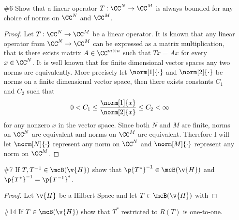 \documentclass[11pt, oneside]{article}
\begin{document}
\begin{enumerate}
\begin{proof}
      Lastly I will show that $\norm{S} = \norm{T}$.
      Consider the following.
      \begin{align*}
        \norm{S} &= \sup*[x \in \overline{D(T)}]{\frac{\norm[Y]{Sx}}{\norm[X]{x}}} \\
      \end{align*}
    \end{proof}

  \pagebreak
  \item[\#6]
    Show that a linear operator $T:\CC^N \to \CC^M$ is always bounded for
    any choice of norms on $\CC^N$ and $\CC^M$.

    \begin{proof}
      Let $T:\CC^N \to \CC^M$ be a linear operator.
      It is known that any linear operator from $\CC^N \to \CC^M$ can be
      expressed as a matrix multiplication, that is there exists matrix
      $A \in \CC^{m \times n}$ such that $Tx = Ax$ for every $x \in \CC^N$.
      It is well known that for finite dimensional vector spaces any two norms
      are equivalently.
      More precisely let $\norm[1]{\cdot}$ and $\norm[2]{\cdot}$ be norms on a
      finite dimensional vector space, then there exists constants $C_1$ and $C_2$ such
      that
      \[
        0 < C_1 \le \frac{\norm[1]{x}}{\norm[2]{x}} \le C_2 < \infty
      \]
      for any nonzero $x$ in the vector space.
      Since both $N$ and $M$ are finite, norms on $\CC^N$ are equivalent
      and norms on $\CC^M$ are equivalent.
      Therefore I will let $\norm[N]{\cdot}$ represent any norm on $\CC^N$ and
      $\norm[M]{\cdot}$ represent any norm on $\CC^M$.
    \end{proof}

  \pagebreak
  \item[\#7]
    If $T, T^{-1} \in \mcB(\v{H})$ show that $\p{T^*}^{-1} \in \mcB(\v{H})$ and
    $\p{T^*}^{-1} = \p{T^{-1}}^*$.

    \begin{proof}
      Let $\v{H}$ be a Hilbert Space and let $T \in \mcB(\v{H})$ with 
    \end{proof}

  \pagebreak
  \item[\#14] %
    If $T \in \mcB(\v{H})$ show that $T^*$ restricted to $R(T)$ is one-to-one.


\end{enumerate}
\end{document}
